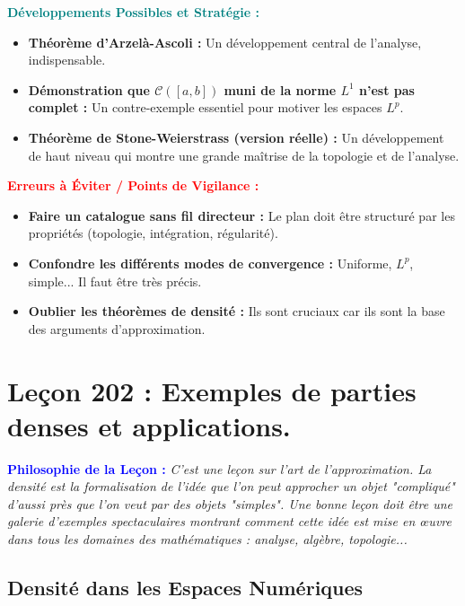 \documentclass[12pt, a4paper, parskip=full]{report}
\theoremstyle{agregstyle}
\newenvironment{philosophie}
  {\par\medskip\noindent\begin{oframed}\noindent\textbf{\textcolor{blue}{Philosophie de la Leçon :}}\itshape}
  {\end{oframed}\par\medskip}
\newenvironment{developpements}
  {\par\medskip\noindent\begin{oframed}\noindent\textbf{\textcolor{teal}{Développements Possibles et Stratégie :}}}
  {\end{oframed}\par\medskip}
\newenvironment{erreurs}
  {\par\medskip\noindent\begin{oframed}\noindent\textbf{\textcolor{red}{Erreurs à Éviter / Points de Vigilance :}}}
  {\end{oframed}\par\medskip}
\begin{document}
\begin{developpements}
    \begin{itemize}
        \item \textbf{Théorème d'Arzelà-Ascoli :} Un développement central de l'analyse, indispensable.
        \item \textbf{Démonstration que $\mathcal{C}([a,b])$ muni de la norme $L^1$ n'est pas complet :} Un contre-exemple essentiel pour motiver les espaces $L^p$.
        \item \textbf{Théorème de Stone-Weierstrass (version réelle) :} Un développement de haut niveau qui montre une grande maîtrise de la topologie et de l'analyse.
    \end{itemize}
\end{developpements}

\begin{erreurs}
    \begin{itemize}
        \item \textbf{Faire un catalogue sans fil directeur :} Le plan doit être structuré par les propriétés (topologie, intégration, régularité).
        \item \textbf{Confondre les différents modes de convergence :} Uniforme, $L^p$, simple... Il faut être très précis.
        \item \textbf{Oublier les théorèmes de densité :} Ils sont cruciaux car ils sont la base des arguments d'approximation.
    \end{itemize}
\end{erreurs}
\chapter{Leçon 202 : Exemples de parties denses et applications.}

\begin{philosophie}
    C'est une leçon sur l'art de l'approximation. La densité est la formalisation de l'idée que l'on peut approcher un objet "compliqué" d'aussi près que l'on veut par des objets "simples". Une bonne leçon doit être une galerie d'exemples spectaculaires montrant comment cette idée est mise en œuvre dans tous les domaines des mathématiques : analyse, algèbre, topologie...
\end{philosophie}

\section{Densité dans les Espaces Numériques}
\end{document}
